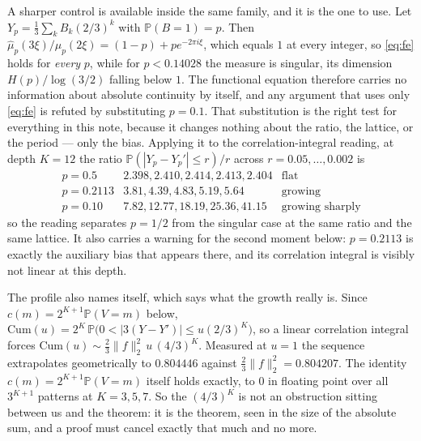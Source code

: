 \documentclass[11pt]{article}
\theoremstyle{remark}
\begin{document}
A sharper control is available inside the same family, and it is the one to use. Let
$Y_p=\tfrac13\sum_kB_k(2/3)^k$ with $\mathbb P(B=1)=p$. Then
$\hat\mu_p(3\xi)/\hat\mu_p(2\xi)=(1-p)+pe^{-2\pi i\xi}$, which equals $1$ at every integer, so
\eqref{eq:fe} holds for \emph{every} $p$, while for $p<0.14028$ the measure is singular, its dimension
$H(p)/\log(3/2)$ falling below $1$. The functional equation therefore carries no information about
absolute continuity by itself, and any argument that uses only \eqref{eq:fe} is refuted by substituting
$p=0.1$. That substitution is the right test for everything in this note, because it changes nothing
about the ratio, the lattice, or the period --- only the bias. Applying it to the correlation-integral
reading, at depth $K=12$ the ratio $\mathbb P(|Y_p-Y_p'|\le r)/r$ across
$r=0.05,\dots,0.002$ is
\[
  \begin{array}{lll}
    p=0.5    &2.398,2.410,2.414,2.413,2.404 &\text{flat}\\
    p=0.2113 &3.81,4.39,4.83,5.19,5.64      &\text{growing}\\
    p=0.10   &7.82,12.77,18.19,25.36,41.15  &\text{growing sharply}
  \end{array}
\]
so the reading separates $p=1/2$ from the singular case at the same ratio and the same lattice. It also
carries a warning for the second moment below: $p=0.2113$ is exactly the auxiliary bias that appears
there, and its correlation integral is visibly not linear at this depth.

The profile also names itself, which says what the growth really is. Since $c(m)=2^{K+1}\mathbb
P(V=m)$ below, $\mathrm{Cum}(u)=2^K\,\mathbb P\bigl(0<|3(Y-Y')|\le u(2/3)^K\bigr)$, so a linear
correlation integral forces $\mathrm{Cum}(u)\sim\tfrac23\|f\|_2^2\,u\,(4/3)^K$. Measured at $u=1$ the
sequence extrapolates geometrically to $0.804446$ against $\tfrac23\|f\|_2^2=0.804207$. The identity
$c(m)=2^{K+1}\mathbb P(V=m)$ itself holds exactly, to $0$ in floating point over all $3^{K+1}$ patterns
at $K=3,5,7$. So the $(4/3)^K$ is not an obstruction sitting between us and the theorem: it is the
theorem, seen in the size of the absolute sum, and a proof must cancel exactly that much and no more.
\end{document}
